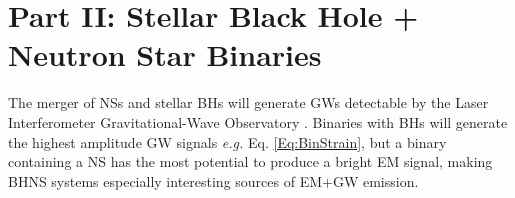 	











































\section{Part II: Stellar Black Hole + Neutron Star Binaries}
%

The merger of NSs and stellar BHs will generate GWs detectable by the Laser
Interferometer Gravitational-Wave Observatory \citep[LIGO][]{aLIGO:2015}.
Binaries with BHs will generate the highest amplitude GW signals \emph{e.g.}
Eq. \ref{Eq:BinStrain}, but a binary containing a NS has the most potential to
produce a bright EM signal, making BHNS systems especially interesting sources
of EM+GW emission.


